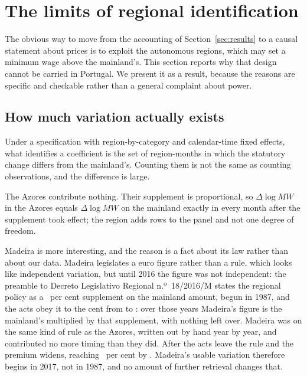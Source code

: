 \section{The limits of regional identification}
\label{sec:robustness}

The obvious way to move from the accounting of Section~\ref{sec:results} to a
causal statement about prices is to exploit the autonomous regions, which may
set a minimum wage above the mainland's. This section reports why that design
cannot be carried in Portugal. We present it as a result, because the reasons
are specific and checkable rather than a general complaint about power.

\subsection{How much variation actually exists}

Under a specification with region-by-category and calendar-time fixed effects,
what identifies a coefficient is the set of region-months in which the statutory
change differs from the mainland's. Counting them is not the same as counting
observations, and the difference is large.

The Azores contribute nothing. Their supplement is proportional, so
$\Delta \log MW$ in the Azores equals $\Delta \log MW$ on the mainland exactly
in every month after the supplement took effect; the region adds rows to the
panel and not one degree of freedom.

Madeira is more interesting, and the reason is a fact about its law rather than
about our data. Madeira legislates a euro figure rather than a rule, which looks
like independent variation, but until 2016 the figure was not independent: the
preamble to Decreto Legislativo Regional n.º~18/2016/M states the regional
policy as a \MadeiraRuleFactorPct{}~per cent supplement on the mainland amount,
begun in 1987, and the acts obey it to the cent from \MadeiraRuleFirstYear{} to
\MadeiraRuleLastYear{}: over those years Madeira's figure is the mainland's
multiplied by that supplement, with nothing left over. Madeira was on the same
kind of rule as the Azores, written out by hand year by year, and contributed no
more timing than they did. After \MadeiraRuleLastYear{} the acts leave the rule
and the premium widens, reaching \MadeiraPremiumEndPct{}~per cent by
\MadeiraPremiumEndYear{}. Madeira's usable
variation therefore begins in 2017, not in 1987, and no amount of further
retrieval changes that.

